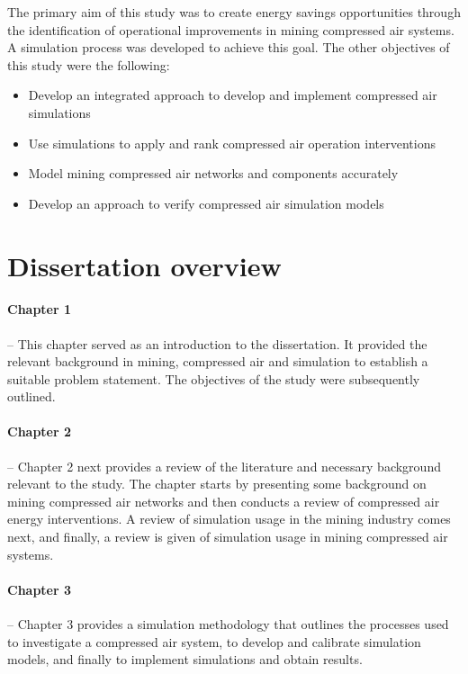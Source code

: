 		The primary aim of this study was to create energy savings opportunities through the identification of operational improvements in mining compressed air systems. A simulation process was developed to achieve this goal. The other objectives of this study were the following:
		\begin{itemize}
			\item Develop an integrated approach to develop and implement compressed air simulations
			\item Use simulations to apply and rank compressed air operation interventions
			\item Model mining compressed air networks and components accurately
			\item Develop an approach to verify compressed air simulation models
		\end{itemize}
		
\section{Dissertation overview}
	\paragraph{Chapter 1} \hspace{0.4cm} -- This chapter served as an introduction to the dissertation. It provided the relevant background in mining, compressed air and simulation to establish a suitable problem statement. The objectives of the study were subsequently outlined.
	\paragraph{Chapter 2} \hspace{0.4cm} -- Chapter 2 next provides a review of the literature and necessary background relevant to the study. The chapter starts by presenting some background on mining compressed air networks and then conducts a review of compressed air energy interventions. A review of simulation usage in the mining industry comes next, and finally, a review  is given of simulation usage in mining compressed air systems.
	\paragraph{Chapter 3} \hspace{0.4cm} -- Chapter 3 provides a simulation methodology that outlines the processes used to investigate a compressed air system, to develop and calibrate simulation models, and finally to implement simulations and obtain results.
